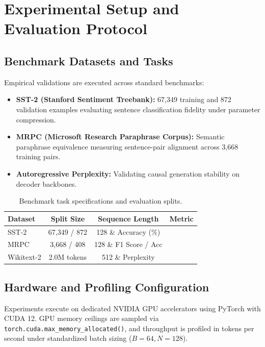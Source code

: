 \section{Experimental Setup and Evaluation Protocol}

\subsection{Benchmark Datasets and Tasks}
Empirical validations are executed across standard benchmarks:
\begin{itemize}
\item \textbf{SST-2 (Stanford Sentiment Treebank):} 67,349 training and 872 validation examples evaluating sentence classification fidelity under parameter compression.
\item \textbf{MRPC (Microsoft Research Paraphrase Corpus):} Semantic paraphrase equivalence measuring sentence-pair alignment across 3,668 training pairs.
\item \textbf{Autoregressive Perplexity:} Validating causal generation stability on decoder backbones.
\end{itemize}

\begin{table}[H]
\centering
\small
\begin{tabularx}{\linewidth}{lccc}
\toprule
\textbf{Dataset} & \textbf{Split Size} & \textbf{Sequence Length} & \textbf{Metric} \\
\midrule
SST-2 & 67,349 / 872 & 128 \& Accuracy (\%) \\
MRPC & 3,668 / 408 & 128 \& F1 Score / Acc \\
Wikitext-2 & 2.0M tokens & 512 \& Perplexity \\
\bottomrule
\end{tabularx}
\caption{Benchmark task specifications and evaluation splits.}
\label{tab:task_specs}
\end{table}

\subsection{Hardware and Profiling Configuration}
Experiments execute on dedicated NVIDIA GPU accelerators using PyTorch with CUDA 12. GPU memory ceilings are sampled via \texttt{torch.cuda.max\_memory\_allocated()}, and throughput is profiled in tokens per second under standardized batch sizing ($B=64, N=128$).
